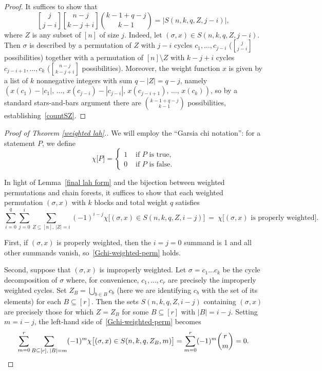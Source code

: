 \documentclass[11pt]{amsart}
\theoremstyle{definition}
\newcommand{\0}{\emptyset}
\newcommand{\sm}{\setminus}
\DeclareRobustCommand{\stir}{\genfrac[]{0pt}{}} %
\newcommand{\Gchi}[1]{\chi\big[#1\big]} %
\begin{document}
\begin{proof}
It suffices to show that
\begin{equation} \label{countSZ}
\stir{j}{j-i} \stir{n-j}{k-j+i}\binom{k-1+q-j}{k-1} = |S(n,k,q,Z,j-i)|,
\end{equation}
where $Z$ is any subset of $[n]$ of size $j$.
Indeed, let $(\sigma,x)\in S(n,k,q,Z,j-i)$.
Then $\sigma$ is described by a permutation of $Z$ with $j-i$ cycles $c_1,\dots,c_{j-i}$ ($\stir{j}{j-i}$ possibilities) together with a permutation of $[n]\sm Z$ with $k-j+i$ cycles $c_{j-i+1},\dots,c_k$ ($\stir{n-j}{k-j+i}$ possibilities).
Moreover, the weight function $x$ is given by a list of $k$ nonnegative integers with sum $q-|Z|=q-j$, namely $(x(c_1)-|c_1|,\,\dots,\,x(c_{j-i})-|c_{j-i}|,\,x(c_{j-i+1}),\,\dots,\,x(c_k))$, so by a standard stars-and-bars argument there are $\binom{k-1+q-j}{k-1}$ possibilities, establishing~\eqref{countSZ}.
\end{proof}

\begin{proof}[Proof of Theorem \ref{weighted lah}.]
We will employ the ``Garsia chi notation'': for a statement $P$, we define
\[\Gchi{P}=\begin{cases} 1 & \text{ if $P$ is true},\\ 0 & \text{ if $P$ is false.}\end{cases}\]

In light of Lemma~\ref{final lah form} and the bijection between weighted permutations and chain forests, it suffices to show that each weighted permutation $(\sigma,x)$ with $k$ blocks and total weight $q$ satisfies
\begin{equation} \label{Gchi-weighted-perm}
\sum_{i=0}^q\sum_{j=0}^{i}\sum_{Z\subseteq [n],\, |Z|=i}(-1)^{i-j}\Gchi{(\sigma,x)\in S(n,k,q,Z,i-j)}
~=~
\Gchi{(\sigma,x)\text{ is properly weighted}}.
\end{equation}

First, if $(\sigma,x)$ is properly weighted, then the $i=j=0$ summand is 1 and all other summands vanish, so~\eqref{Gchi-weighted-perm} holds.

Second, suppose that $(\sigma,x)$ is improperly weighted.
Let $\sigma=c_1\dots c_k$ be the cycle decomposition of $\sigma$ where, for convenience, $c_1,\dots,c_r$ are precisely the improperly weighted cycles.
Set $Z_B=\bigcup_{b\in B}c_b$ (here we are identifying $c_b$ with the set of its elements) for each $B\subseteq[r]$.
Then the sets $S(n,k,q,Z,i-j)$ containing $(\sigma,x)$ are precisely those for which $Z=Z_B$ for some $B\subseteq[r]$ with $|B|=i-j$.
Setting $m=i-j$, the left-hand side of~\eqref{Gchi-weighted-perm} becomes
\[\sum_{m=0}^r\sum_{B\subseteq[r],\: |B|=m}(-1)^m \Gchi{(\sigma,x)\in S(n,k,q,Z_B,m)}
=\sum_{m=0}^r(-1)^m\binom{r}{m}
= 0.\qedhere\]
\end{proof}
\end{document}
